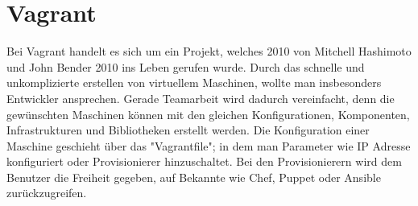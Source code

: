 \chapter{Vagrant}
Bei Vagrant handelt es sich um ein Projekt, welches 2010 von Mitchell Hashimoto und John Bender 2010 ins Leben gerufen wurde.
Durch das schnelle und unkomplizierte erstellen von virtuellem Maschinen, wollte man insbesonders Entwickler ansprechen.
Gerade Teamarbeit wird dadurch vereinfacht, denn die gewünschten Maschinen können mit den gleichen Konfigurationen, Komponenten, Infrastrukturen und Bibliotheken erstellt werden.
Die Konfiguration einer Maschine geschieht über das "Vagrantfile"; in dem man Parameter wie IP Adresse konfiguriert oder Provisionierer hinzuschaltet.
Bei den Provisionierern wird dem Benutzer die Freiheit gegeben, auf Bekannte wie Chef, Puppet oder Ansible zurückzugreifen.




